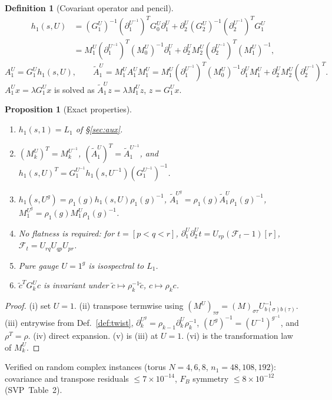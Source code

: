 \documentclass[11pt]{article}
\theoremstyle{definition}
\newtheorem{definition}{Definition}[section]
\theoremstyle{plain}
\newtheorem{proposition}{Proposition}[section]
\theoremstyle{remark}
\newcommand{\bd}{\partial}
\newcommand{\Tr}{^{T}}
\newcommand{\At}{\widetilde{A}}
\begin{document}
\begin{definition}[Covariant operator and pencil]\label{def:h}
\begin{align*}
h_1(s,U)&=(G_1^{U})^{-1}(\bd_1^{U^{-1}})\Tr G_0^{U}\bd_1^{U}+\bd_2^{U}(G_2^{U})^{-1}(\bd_2^{U^{-1}})\Tr G_1^{U}\\
&=M_1^{U}(\bd_1^{U^{-1}})\Tr(M_0^{U})^{-1}\bd_1^{U}+\bd_2^{U}M_2^{U}(\bd_2^{U^{-1}})\Tr(M_1^{U})^{-1},
\end{align*}
\[
A_1^{U}=G_1^{U}h_1(s,U),\qquad
\At_1^{U}=M_1^{U}A_1^{U}M_1^{U}=M_1^{U}(\bd_1^{U^{-1}})\Tr(M_0^{U})^{-1}\bd_1^{U}M_1^{U}+\bd_2^{U}M_2^{U}(\bd_2^{U^{-1}})\Tr .
\]
\(A_1^{U}x=\lambda G_1^{U}x\) is solved as \(\At_1^{U}z=\lambda M_1^{U}z\), \(z=G_1^{U}x\).
\end{definition}

\begin{proposition}[Exact properties]\label{prop:h}
\begin{enumerate}[nosep]
\item[(i)] \(h_1(s,1)=L_1\) of \S\ref{sec:aux}.
\item[(ii)] \((M_k^{U})\Tr=M_k^{U^{-1}}\), \((\At_1^{U})\Tr=\At_1^{U^{-1}}\), and \(h_1(s,U)\Tr=G_1^{U^{-1}}h_1(s,U^{-1})(G_1^{U^{-1}})^{-1}\).
\item[(iii)] \(h_1(s,U^{g})=\rho_1(g)h_1(s,U)\rho_1(g)^{-1}\), \(\At_1^{U^g}=\rho_1(g)\At_1^{U}\rho_1(g)^{-1}\), \(M_1^{U^g}=\rho_1(g)M_1^{U}\rho_1(g)^{-1}\).
\item[(iv)] No flatness is required: for \(t=[p<q<r]\), \(\bd_1^{U}\bd_2^{U}t=U_{rp}(\mathcal F_t-1)[r]\), \(\mathcal F_t=U_{rq}U_{qp}U_{pr}\).
\item[(v)] Pure gauge \(U=1^{g}\) is isospectral to \(L_1\).
\item[(vi)] \(\widetilde c\Tr G_k^{U}c\) is invariant under \(\widetilde c\mapsto\rho_k^{-1}\widetilde c\), \(c\mapsto\rho_kc\).
\end{enumerate}
\end{proposition}
\begin{proof}
(i) set \(U=1\). (ii) transpose termwise using \((M^{U})_{\tau\sigma}=(M)_{\sigma\tau}U_{b(\sigma)b(\tau)}^{-1}\). (iii) entrywise from Def.~\ref{def:twist}, \(\bd_k^{U^g}=\rho_{k-1}\bd_k^{U}\rho_k^{-1}\), \((U^{g})^{-1}=(U^{-1})^{g^{-1}}\), and \(\rho\Tr=\rho\). (iv) direct expansion. (v) is (iii) at \(U=1\). (vi) is the transformation law of \(M_k^{U}\).
\end{proof}
Verified on random complex instances (torus \(N=4,6,8\), \(n_1=48,108,192\)): covariance and transpose residuals \(\le7\times10^{-14}\), \(F_B\) symmetry \(\le8\times10^{-12}\) (SVP~Table~2).
\end{document}
